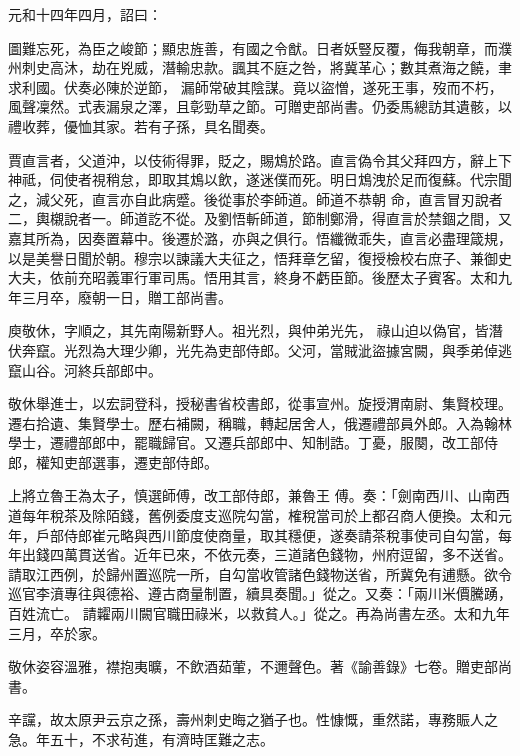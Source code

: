 \begin{pinyinscope}
 元和十四年四月，詔曰：



 圖難忘死，為臣之峻節；顯忠旌善，有國之令猷。日者妖豎反覆，侮我朝章，而濮州刺史高沐，劫在兇威，潛輸忠款。諷其不庭之咎，將冀革心；數其煮海之饒，聿求利國。伏奏必陳於逆節，
 漏師常破其陰謀。竟以盜憎，遂死王事，歿而不朽，風聲凜然。式表漏泉之澤，且彰勁草之節。可贈吏部尚書。仍委馬總訪其遺骸，以禮收葬，優恤其家。若有子孫，具名聞奏。



 賈直言者，父道沖，以伎術得罪，貶之，賜鴆於路。直言偽令其父拜四方，辭上下神祗，伺使者視稍怠，即取其鴆以飲，遂迷僕而死。明日鴆洩於足而復蘇。代宗聞之，減父死，直言亦自此病蹙。後從事於李師道。師道不恭朝
 命，直言冒刃說者二，輿櫬說者一。師道訖不從。及劉悟斬師道，節制鄭滑，得直言於禁錮之間，又嘉其所為，因奏置幕中。後遷於潞，亦與之俱行。悟纖微乖失，直言必盡理箴規，以是美譽日聞於朝。穆宗以諫議大夫征之，悟拜章乞留，復授檢校右庶子、兼御史大夫，依前充昭義軍行軍司馬。悟用其言，終身不虧臣節。後歷太子賓客。太和九年三月卒，廢朝一日，贈工部尚書。



 庾敬休，字順之，其先南陽新野人。祖光烈，與仲弟光先，
 祿山迫以偽官，皆潛伏奔竄。光烈為大理少卿，光先為吏部侍郎。父河，當賊泚盜據宮闕，與季弟倬逃竄山谷。河終兵部郎中。



 敬休舉進士，以宏詞登科，授秘書省校書郎，從事宣州。旋授渭南尉、集賢校理。遷右拾遺、集賢學士。歷右補闕，稱職，轉起居舍人，俄遷禮部員外郎。入為翰林學士，遷禮部郎中，罷職歸官。又遷兵部郎中、知制誥。丁憂，服闋，改工部侍郎，權知吏部選事，遷吏部侍郎。



 上將立魯王為太子，慎選師傅，改工部侍郎，兼魯王
 傅。奏：「劍南西川、山南西道每年稅茶及除陌錢，舊例委度支巡院勾當，榷稅當司於上都召商人便換。太和元年，戶部侍郎崔元略與西川節度使商量，取其穩便，遂奏請茶稅事使司自勾當，每年出錢四萬貫送省。近年已來，不依元奏，三道諸色錢物，州府逗留，多不送省。請取江西例，於歸州置巡院一所，自勾當收管諸色錢物送省，所冀免有逋懸。欲令巡官李濆專往與德裕、遵古商量制置，續具奏聞。」從之。又奏：「兩川米價騰踴，百姓流亡。
 請糶兩川闕官職田祿米，以救貧人。」從之。再為尚書左丞。太和九年三月，卒於家。



 敬休姿容溫雅，襟抱夷曠，不飲酒茹葷，不邇聲色。著《諭善錄》七卷。贈吏部尚書。



 辛讜，故太原尹云京之孫，壽州刺史晦之猶子也。性慷慨，重然諾，專務賑人之急。年五十，不求茍進，有濟時匡難之志。




\end{pinyinscope}
